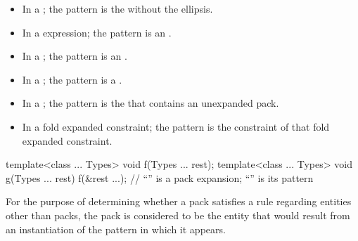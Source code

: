 \begin{itemize}
\item In a ; the pattern is
the  without the ellipsis.

\item In a  expression; the pattern is an
.

\item In a ;
the pattern is an .

\item In a ;
the pattern is a .

\item In a ;
the pattern is the 
that contains an unexpanded pack.

\item In a fold expanded constraint;
the pattern is the constraint of that fold expanded constraint.
\end{itemize}

\begin{example}
\begin{codeblock}
template<class ... Types> void f(Types ... rest);
template<class ... Types> void g(Types ... rest) {
  f(&rest ...);     // ``'' is a pack expansion; ``'' is its pattern
}
\end{codeblock}
\end{example}

\pnum
For the purpose of determining whether a pack satisfies a rule
regarding entities other than packs, the pack is
considered to be the entity that would result from an instantiation of
the pattern in which it appears.

